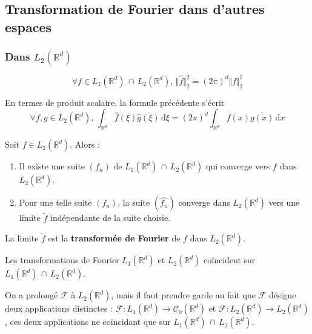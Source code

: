 	\subsection{Transformation de Fourier dans d'autres espaces}

	\subsubsection{Dans \texorpdfstring{$L_2(\mathbb{R}^d)$}{L₂(Rᵈ)}}


	\begin{theorem}
		\[ \forall f \in L_1(\mathbb{R}^d) \, \cap \, L_2(\mathbb{R}^d), \, \Vert \widehat{f} \Vert^2_2 = (2 \pi)^d \Vert f \Vert^2_2 \]
	\end{theorem}

	\begin{remark}
		En termes de produit scalaire, la formule précédente s'écrit
		\[ \forall f, g \in L_2(\mathbb{R}^d), \, \int_{\mathbb{R}^d} \widehat{f}(\xi) \overline{\widehat{g}(\xi)} \, \mathrm{d}\xi = (2 \pi)^d \int_{\mathbb{R}^d} f(x) \overline{g(x)} \, \mathrm{d}x \]
	\end{remark}

	\begin{theorem}
		Soit $f \in L_2(\mathbb{R}^d)$. Alors :
		\begin{enumerate}[label=(\roman*)]
			\item Il existe une suite $(f_n)$ de $L_1(\mathbb{R}^d) \, \cap \, L_2(\mathbb{R}^d)$ qui converge vers $f$ dans $L_2(\mathbb{R}^d)$.
			\item Pour une telle suite $(f_n)$, la suite $(\widehat{f_n})$ converge dans $L_2(\mathbb{R}^d)$ vers une limite $\widetilde{f}$ indépendante de la suite choisie.
		\end{enumerate}
	\end{theorem}

	\begin{definition}
		La limite $\widetilde{f}$ est la \textbf{transformée de Fourier} de $f$ dans $L_2(\mathbb{R}^d)$.
	\end{definition}

	\begin{proposition}
		Les transformations de Fourier $L_1(\mathbb{R}^d)$ et $L_2(\mathbb{R}^d)$ coïncident sur $L_1(\mathbb{R}^d) \, \cap \, L_2(\mathbb{R}^d)$.
	\end{proposition}

	\begin{remark}
		On a prolongé $\mathcal{F}$ à $L_2(\mathbb{R}^d)$, mais il faut prendre garde au fait que $\mathcal{F}$ désigne deux applications distinctes : $\mathcal{F} : L_1(\mathbb{R}^d) \rightarrow \mathcal{C}_0(\mathbb{R}^d)$ et $\mathcal{F} : L_2(\mathbb{R}^d) \rightarrow L_2(\mathbb{R}^d)$, ces deux applications ne coïncidant que sur $L_1(\mathbb{R}^d) \, \cap \, L_2(\mathbb{R}^d)$.
	\end{remark}

